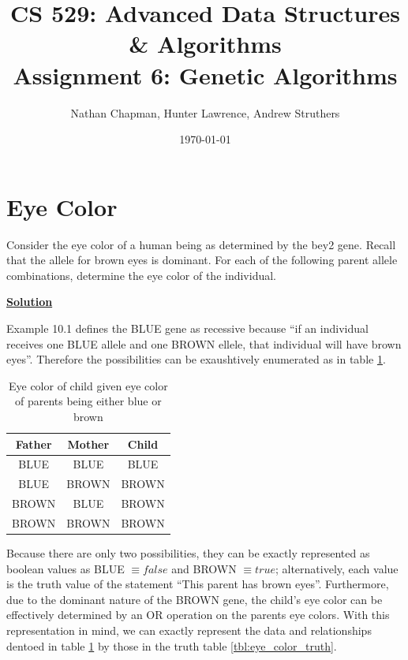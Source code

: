 \documentclass{article}
\title{\vspace*{-0.625in}CS 529: Advanced Data Structures \& Algorithms \\ Assignment 6: Genetic Algorithms}
\author{Nathan Chapman, Hunter Lawrence, Andrew Struthers}
\date{\today}
\renewcommand{\_}{\ifincsname_\else\legacyunderscore\fi}
\begin{document}
\maketitle

\section*{Eye Color}

    Consider the eye color of a human being as determined by the bey2 gene.  Recall that the allele for brown eyes is dominant.  For each of the following parent allele combinations, determine the eye color of the individual.

    \underline{\textbf{Solution}}

    Example 10.1 defines the BLUE gene as recessive because ``if an individual receives one BLUE allele and one BROWN ellele, that individual will have brown eyes''.  Therefore the possibilities can be exaushtively enumerated as in table \ref{tbl:eye_color}.

    \begin{table}[h]
        \centering
        \begin{tabular}{|c|c|c|}
            \hline
            Father & Mother & Child \\
            \hline
            BLUE   & BLUE   & BLUE  \\
            \hline
            BLUE   & BROWN  & BROWN \\
            \hline            
            BROWN  & BLUE   & BROWN \\
            \hline
            BROWN  & BROWN  & BROWN \\
            \hline
        \end{tabular}
        \caption{Eye color of child given eye color of parents being either blue or brown}
        \label{tbl:eye_color}
    \end{table}

    Because there are only two possibilities, they can be exactly represented as boolean values as BLUE $\equiv false$ and BROWN $\equiv true$; alternatively, each value is the truth value of the statement ``This parent has brown eyes''.  Furthermore, due to the dominant nature of the BROWN gene, the child's eye color can be effectively determined by an OR operation on the parents eye colors.  With this representation in mind, we can exactly represent the data and relationships dentoed in table \ref{tbl:eye_color} by those in the truth table \ref{tbl:eye_color_truth}.
\end{document}
